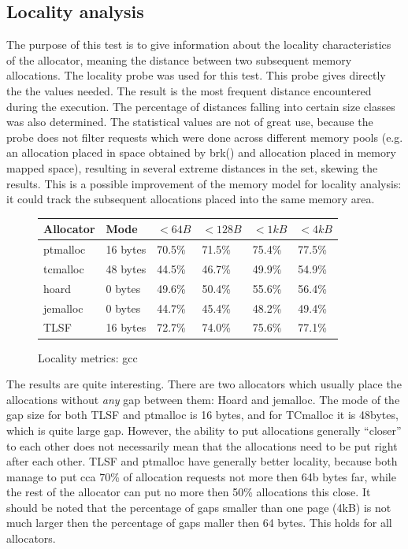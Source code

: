 \subsection{Locality analysis}

The purpose of this test is to give information about the locality characteristics of the allocator, meaning the distance between two subsequent memory allocations. The locality probe was used for this test. This probe gives directly the the values needed. The result is the most frequent distance encountered during the execution. The percentage of distances falling into certain size classes was also determined. The statistical values are not of great use, because the probe does not filter requests which were done across different memory pools (e.g. an allocation placed in space obtained by brk() and allocation placed in memory mapped space), resulting in several extreme distances in the set, skewing the results. This is a possible improvement of the memory model for locality analysis: it could track the subsequent allocations placed into the same memory area.

\begin{figure}[h]
\begin{center}
\begin{tabular}{|l|l|l|l|l|l|}
\hline
Allocator & Mode & $ <64B $ & $ <128B $ & $ <1kB $ & $ <4kB $ \\ \hline \hline
ptmalloc & 16 bytes & 70.5\% & 71.5\% & 75.4\% & 77.5\% \\ \hline
tcmalloc & 48 bytes & 44.5\% & 46.7\% & 49.9\% & 54.9\% \\ \hline
hoard & 0 bytes & 49.6\% & 50.4\% & 55.6\% & 56.4\% \\ \hline
jemalloc & 0 bytes & 44.7\% & 45.4\% & 48.2\% & 49.4\% \\ \hline
TLSF & 16 bytes & 72.7\% & 74.0\% & 75.6\% & 77.1\% \\ \hline
\end{tabular}
\caption{Locality metrics: gcc}
\label{loc:gcc}
\end{center}
\end{figure}

The results are quite interesting. There are two allocators which usually place the allocations without {\em any} gap between them: Hoard and jemalloc. The mode of the gap size for both TLSF and ptmalloc is 16 bytes, and for TCmalloc it is 48bytes, which is quite large gap. However, the ability to put allocations generally ``closer'' to each other does not necessarily mean that the allocations need to be put right after each other. TLSF and ptmalloc have generally better locality, because both manage to put cca 70\% of allocation requests not more then 64b bytes far, while the rest of the allocator can put no more then 50\% allocations this close. It should be noted that the percentage of gaps smaller than one page (4kB) is not much larger then the percentage of gaps maller then 64 bytes. This holds for all allocators.

